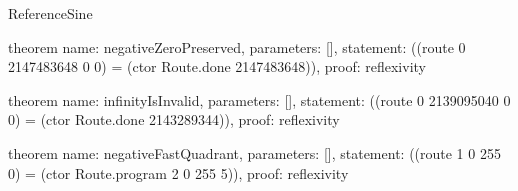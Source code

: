 \begin{lexlean}{ReferenceSine}
\begin{semanticmodule}
theorem{
  name: negativeZeroPreserved,
  parameters: [],
  statement: ((route 0 2147483648 0 0) = (ctor Route.done 2147483648)),
  proof: reflexivity{}
}

theorem{
  name: infinityIsInvalid,
  parameters: [],
  statement: ((route 0 2139095040 0 0) = (ctor Route.done 2143289344)),
  proof: reflexivity{}
}

theorem{
  name: negativeFastQuadrant,
  parameters: [],
  statement: ((route 1 0 255 0) = (ctor Route.program 2 0 255 5)),
  proof: reflexivity{}
}

\end{semanticmodule}
\end{lexlean}

